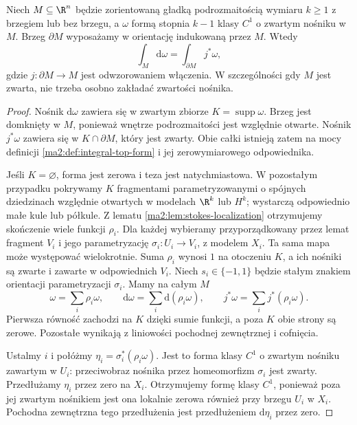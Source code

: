 \begin{twierdzenie}
\label{ma2:thm:general-stokes}
Niech $M\subseteq\R^n$ będzie zorientowaną
gładką podrozmaitością wymiaru $k\ge1$
z brzegiem lub bez brzegu, a $\omega$
formą stopnia $k-1$ klasy $C^1$
o zwartym nośniku w $M$.
Brzeg $\partial M$ wyposażamy w orientację
indukowaną przez $M$.
Wtedy
\[
 \boxed{\displaystyle
 \int_M\mathrm d\omega=\int_{\partial M}j^*\omega,}
\]
gdzie $j:\partial M\to M$ jest odwzorowaniem
włączenia.
W szczególności gdy $M$ jest zwarta,
nie trzeba osobno zakładać zwartości nośnika.
\end{twierdzenie}
\begin{proof}
Nośnik $\mathrm d\omega$ zawiera się
w zwartym zbiorze $K=\operatorname{supp}\omega$.
Brzeg jest domknięty w $M$, ponieważ
wnętrze podrozmaitości jest względnie otwarte.
Nośnik $j^*\omega$ zawiera się w $K\cap\partial M$,
który jest zwarty. Obie całki istnieją zatem
na mocy definicji \ref{ma2:def:integral-top-form}
i jej zerowymiarowego odpowiednika.

Jeśli $K=\varnothing$, forma jest zerowa i teza
jest natychmiastowa. W pozostałym przypadku
pokrywamy $K$ fragmentami parametryzowanymi
o spójnych dziedzinach względnie otwartych
w modelach $\R^k$ lub $H^k$; wystarczą
odpowiednio małe kule lub półkule.
Z lematu \ref{ma2:lem:stokes-localization}
otrzymujemy skończenie wiele funkcji $\rho_i$.
Dla każdej wybieramy przyporządkowany przez
lemat fragment $V_i$ i jego parametryzację
$\sigma_i:U_i\to V_i$, z modelem $X_i$.
Ta sama mapa może występować wielokrotnie.
Suma $\rho_i$ wynosi $1$ na otoczeniu $K$,
a ich nośniki są zwarte i zawarte w odpowiednich
$V_i$. Niech $s_i\in\{-1,1\}$ będzie stałym
znakiem orientacji parametryzacji $\sigma_i$.
Mamy na całym $M$
\[
 \omega=\sum_i\rho_i\omega,\qquad
 \mathrm d\omega=\sum_i\mathrm d(\rho_i\omega),
 \qquad j^*\omega=\sum_i j^*(\rho_i\omega).
\]
Pierwsza równość zachodzi na $K$ dzięki sumie
funkcji, a poza $K$ obie strony są zerowe.
Pozostałe wynikają z liniowości pochodnej
zewnętrznej i cofnięcia.

Ustalmy $i$ i połóżmy $\eta_i=\sigma_i^*(\rho_i\omega)$.
Jest to forma klasy $C^1$ o zwartym nośniku
zawartym w $U_i$: przeciwobraz nośnika
przez homeomorfizm $\sigma_i$ jest zwarty.
Przedłużamy $\eta_i$ przez zero na $X_i$.
Otrzymujemy formę klasy $C^1$, ponieważ
poza jej zwartym nośnikiem jest ona lokalnie
zerowa również przy brzegu $U_i$ w $X_i$.
Pochodna zewnętrzna tego przedłużenia
jest przedłużeniem $\mathrm d\eta_i$ przez zero.


\end{proof}
